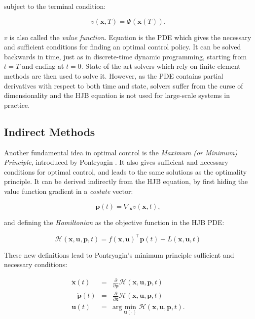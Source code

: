 subject to the terminal condition:

\begin{equation}
\label{eq:chap3-hjb-cond}
v(\mathbf{x},T)=\Phi(\mathbf{x}(T)).
\end{equation}

$v$ is also called the \emph{value function}. Equation
 is the PDE which gives the necessary and
sufficient conditions for finding an optimal control policy. It can be
solved backwards in time, just as in discrete-time dynamic
programming, starting from $t=T$ and ending at $
t=0$. State-of-the-art solvers which rely on finite-element methods
are then used to solve it. However, as the PDE contains partial
derivatives with respect to both time and state, solvers suffer from
the curse of dimensionality and the HJB equation is not used for
large-scale systems in practice.

\subsection{Indirect Methods}

Another fundamental idea in optimal control is the \emph{Maximum (or
  Minimum) Principle}, introduced by Pontryagin
\cite{boltyanskii1960theory}. It also gives sufficient and necessary
conditions for optimal control, and leads to the same solutions as the
optimality principle. It can be derived indirectly from the HJB
equation, by first hiding the value function gradient in a
\emph{costate} vector:

\begin{equation}
  \mathbf{p}(t) = \nabla_{\mathbf{x}} v(\mathbf{x},t),
\end{equation} 

and defining the \emph{Hamiltonian} as the objective function in the
HJB PDE:

\begin{equation}
  \mathcal{H}(\mathbf{x},\mathbf{u},\mathbf{p},t) = f(\mathbf{x},
  \mathbf{u})^{\top}\mathbf{p}(t) + L (\mathbf{x}, \mathbf{u},t)
\end{equation}

These new definitions lead to Pontryagin's minimum principle
sufficient and necessary conditions:

\begin{equation}
\begin{array}{rcl}
\dot{\mathbf{x}}(t) &=&
\frac{\partial}{\partial\mathbf{p}}\mathcal{H}(\mathbf{x},\mathbf{u},\mathbf{p},t)
\\ -\dot{\mathbf{p}}(t) &=&
\frac{\partial}{\partial\mathbf{x}}\mathcal{H}(\mathbf{x},\mathbf{u},\mathbf{p},t)
\\ \mathbf{u}(t) &=&
\text{arg}\min_{\mathbf{u}(\cdot)}\mathcal{H}(\mathbf{x},\mathbf{u},\mathbf{p},t).
\end{array}
\end{equation}

